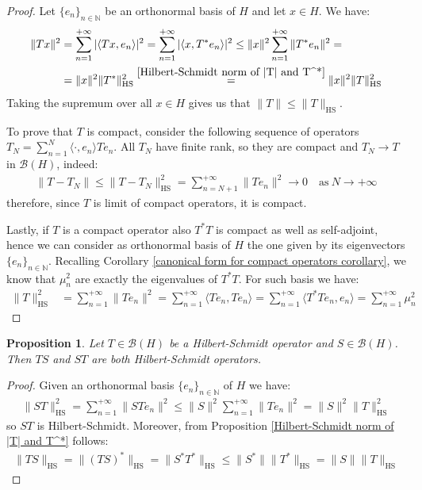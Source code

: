 \documentclass[corpo=11pt, stile=classica, tipotesi=custom,
greek, evenboxes, english]{toptesi}
\numberwithin{equation}{chapter}
\newtheorem{prop}[teo]{Proposition}
\theoremstyle{remark}
\newcommand{\N}{\mathbb{N}} %
\newcommand{\B}{\mathscr{B}} %
\begin{document}
\begin{proof}
	Let $\{e_n\}_{n \in \N}$ be an orthonormal basis of $H$ and let $x \in H$. We have:
	\begin{align*}
		\|Tx\|^2 &= \sum_{n=1}^{+\infty} |\langle Tx,e_n \rangle|^2 = \sum_{n=1}^{+\infty} |\langle x,T^*e_n \rangle|^2 \leq \|x\|^2 \sum_{n=1}^{+\infty} \|T^*e_n\|^2 =\\
				 &= \|x\|^2 \|T^*\|_{\mathrm{HS}}^2 \overset{\eqref{Hilbert-Schmidt norm of |T| and T^*}}{=} \|x\|^2 \|T\|_{\mathrm{HS}}^2
	\end{align*}
	Taking the supremum over all $x \in H$ gives us that $\|T\| \leq \|T\|_{\mathrm{HS}}$.
	
	To prove that $T$ is compact, consider the following sequence of operators $T_N = \sum_{n=1}^{N} \langle \cdot , e_n \rangle Te_n$. All $T_N$ have finite rank, so they are compact and $T_N \rightarrow T$ in $\B(H)$, indeed:
	\begin{align*}
		\|T-T_N\| \leq \|T-T_N\|_{\mathrm{HS}}^2 = \sum_{n=N+1}^{+\infty} \|T e_n\|^2 \rightarrow 0 \quad \mathrm{as\ } N \rightarrow +\infty
	\end{align*}
	therefore, since $T$ is limit of compact operators, it is compact.
	
	Lastly, if $T$ is a compact operator also $T^*T$ is compact as well as self-adjoint, hence we can consider as orthonormal basis of $H$ the one given by its eigenvectors $\{e_n\}_{n \in \N}$. Recalling Corollary \ref{canonical form for compact operators corollary}, we know that $\mu_n^2$ are exactly the eigenvalues of $T^*T$.  For such basis we have:
	\begin{align*}
		\|T\|_{\mathrm{HS}}^2 &= \sum_{n=1}^{+\infty} \|Te_n\|^2 = \sum_{n=1}^{+\infty} \langle Te_n,Te_n \rangle = \sum_{n=1}^{+\infty} \langle T^*T e_n,e_n \rangle = \sum_{n=1}^{+\infty} \mu_n^2
	\end{align*}
\end{proof}
\begin{prop}\label{Hilbert-Schmidt operator are an ideal}
	Let $T \in \B(H)$ be a Hilbert-Schmidt operator and $S \in \B(H)$. Then $TS$ and $ST$ are both Hilbert-Schmidt operators.
\end{prop}
\begin{proof}
	Given an orthonormal basis $\{e_n\}_{n \in \N}$ of $H$ we have:
	\begin{align*}
		\|ST\|_{\mathrm{HS}}^2 = \sum_{n=1}^{+\infty} \|ST e_n\|^2 \leq \|S\|^2 \sum_{n=1}^{+\infty} \|T e_n\|^2 = \|S\|^2 \|T\|_{\mathrm{HS}}^2
	\end{align*}
	so $ST$ is Hilbert-Schmidt. Moreover, from Proposition \ref{Hilbert-Schmidt norm of |T| and T^*} follows:
	\begin{align*}
		\| TS \|_{\mathrm{HS}} = \| (TS)^* \|_{\mathrm{HS}} = \| S^* T^* \|_{\mathrm{HS}} \leq \|S^*\| \|  T^* \|_{\mathrm{HS}} = \|S \| \| T \|_{\mathrm{HS}}
	\end{align*}
\end{proof}
\end{document}
